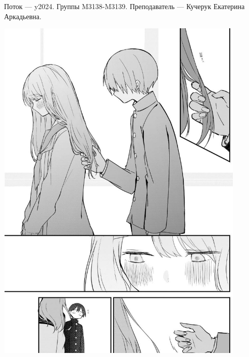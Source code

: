 Поток — y2024.\newline
Группы M3138-M3139.\newline
Преподаватель --- Кучерук Екатерина Аркадьевна.\par

\begin{center}
   \includegraphics[width=12cm, height=17cm]{MyLoveImages/myLoveLove.jpg}
\end{center}